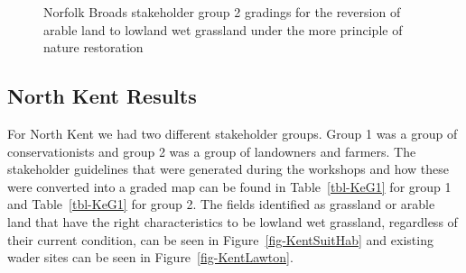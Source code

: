\documentclass[
  12pt,
  letterpaper,
  DIV=11,
  numbers=noendperiod]{scrartcl}
\begin{document}
\begin{figure}[H]


\caption{\label{fig-BroadsArMoreG2}Norfolk Broads stakeholder group 2
gradings for the reversion of arable land to lowland wet grassland under
the more principle of nature restoration}

\end{figure}%

\newpage{}

\subsection{North Kent Results}\label{north-kent-results}

For North Kent we had two different stakeholder groups. Group 1 was a
group of conservationists and group 2 was a group of landowners and
farmers. The stakeholder guidelines that were generated during the
workshops and how these were converted into a graded map can be found in
Table~\ref{tbl-KeG1} for group 1 and Table~\ref{tbl-KeG1} for group 2.
The fields identified as grassland or arable land that have the right
characteristics to be lowland wet grassland, regardless of their current
condition, can be seen in Figure~\ref{fig-KentSuitHab} and existing
wader sites can be seen in Figure~\ref{fig-KentLawton}.
\end{document}
